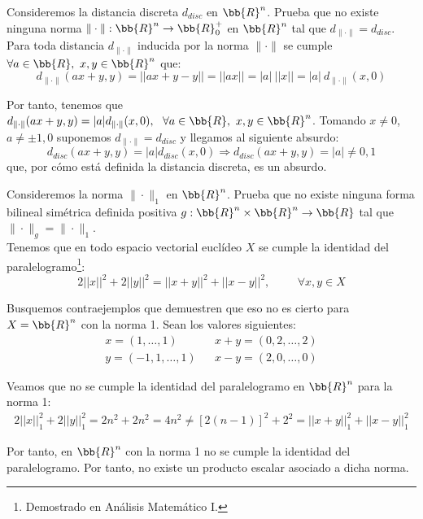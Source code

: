 \begin{ejercicio}
    Consideremos la distancia discreta $d_{disc}$ en $\bb{R}^n$. Prueba que no existe ninguna norma $\|\cdot \|:\bb{R}^n\to \bb{R}^+_0$ en $\bb{R}^n$ tal que $d_{\|\cdot \|} = d_{disc}$.\\

    Para toda distancia $d_{\|\cdot \|}$ inducida por la norma $\|\cdot \|$ se cumple $\forall a\in \bb{R},~x,y\in \bb{R}^n$ que:
    \begin{equation*}
        d_{\|\cdot \|}(ax+y, y) = ||ax+y-y||=||ax||=|a|~||x|| = |a|~d_{\|\cdot \|}(x,0)
    \end{equation*}

    Por tanto, tenemos que $d_{\|\cdot \|}(ax+y, y)=|a|d_{\|\cdot \|}(x,0),~~\forall a\in \bb{R},~x,y\in \bb{R}^n$. Tomando $x\neq 0$, $a\neq \pm 1, 0$ suponemos $d_{\|\cdot \|} = d_{disc}$ y llegamos al siguiente absurdo:
    \begin{equation*}
        d_{disc}(ax+y, y)=|a|d_{disc}(x,0) \Longrightarrow d_{disc}(ax+y, y) = |a| \neq 0,1
    \end{equation*}
    que, por cómo está definida la distancia discreta, es un absurdo.
\end{ejercicio}


\begin{ejercicio}
    Consideremos la norma $\|\cdot \|_1$ en $\bb{R}^n$. Prueba que no existe ninguna forma bilineal simétrica definida positiva $g:\bb{R}^n\times \bb{R}^n\to \bb{R}$ tal que $\|\cdot \|_g=\|\cdot \|_1$.\\

    Tenemos que en todo espacio vectorial euclídeo $X$ se cumple la identidad del paralelogramo\footnote{Demostrado en Análisis Matemático I.}:
    \begin{equation*}
        2||x||^2 + 2||y||^2 = ||x+y||^2 + ||x-y||^2, \hspace{1cm} \forall x,y\in X
    \end{equation*}
    
    Busquemos contraejemplos que demuestren que eso no es cierto para $X=\bb{R}^n$ con la norma 1. Sean los valores siguientes:
    \begin{align*}
        x=(1,\dots, 1) && x+y = (0,2,\dots, 2) \\
        y=(-1,1,\dots, 1) && x-y = (2, 0, \dots, 0) 
    \end{align*}
    
    Veamos que no se cumple la identidad del paralelogramo en $\bb{R}^n$ para la norma 1:
    \begin{gather*}
        2||x||_1^2 + 2||y||_1^2 = 2n^2 + 2n^2 = 4n^2 \neq 
        [2(n-1)]^2 + 2^2 = ||x+y||_1^2 + ||x-y||_1^2
    \end{gather*}

    Por tanto, en $\bb{R}^n$ con la norma 1 no se cumple la identidad del paralelogramo. Por tanto, no existe un producto escalar asociado a dicha norma.
\end{ejercicio}


